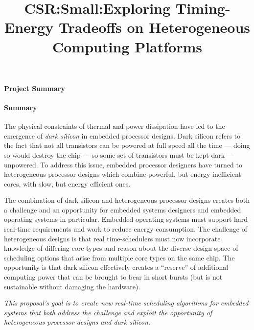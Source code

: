\documentclass[10pt,letterpaper]{article}
\title{\textbf{CSR:Small:Exploring Timing-Energy Tradeoffs on Heterogeneous Computing Platforms}}
\date{\vspace{4mm}}
\begin{document}

\maketitle
{}


\newpage 

\begin{center}
\Large{\textbf{Project Summary}}
\end{center}

\paragraph{Summary}
The physical constraints of thermal and power dissipation have led to
the emergence of \emph{dark silicon} in embedded processor designs.
Dark silicon refers to the fact that not all transistors can be
powered at full speed all the time --- doing so would destroy the chip
--- so some set of transistors must be kept dark --- unpowered.  To
address this issue, embedded processor designers have turned to
heterogeneous processor designs which combine powerful, but energy
inefficient cores, with slow, but energy efficient ones.

The combination of dark silicon and heterogeneous processor designs
creates both a challenge and an opportunity for embedded systems
designers and embedded operating systems in particular.  Embedded
operating systems must support hard real-time requirements and work to
reduce energy consumption.  The challenge of heterogeneous designs is
that real time-schedulers must now incorporate knowledge of differing
core types and reason about the diverse design space of scheduling
options that arise from multiple core types on the same chip.  The
opportunity is that dark silicon effectively creates a ``reserve'' of
additional computing power that can be brought to bear in short bursts
(but is not sustainable without damaging the hardware).  

\emph{This proposal's goal is to create new real-time scheduling
  algorithms for embedded systems that both address the challenge and
  exploit the opportunity of heterogeneous processor designs and dark
  silicon.}
\end{document}
